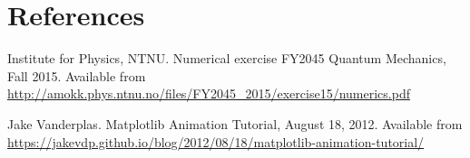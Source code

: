 \documentclass[5p]{elsarticle}       			%
\begin{document}
\section*{References}

\begin{thebibliography}{99}

Institute for Physics, NTNU. Numerical exercise FY2045 Quantum Mechanics, Fall 2015. Available from \url{http://amokk.phys.ntnu.no/files/FY2045_2015/exercise15/numerics.pdf}

Jake Vanderplas. Matplotlib Animation Tutorial, August 18, 2012. Available from \url{https://jakevdp.github.io/blog/2012/08/18/matplotlib-animation-tutorial/}


\end{thebibliography}
\end{document}
